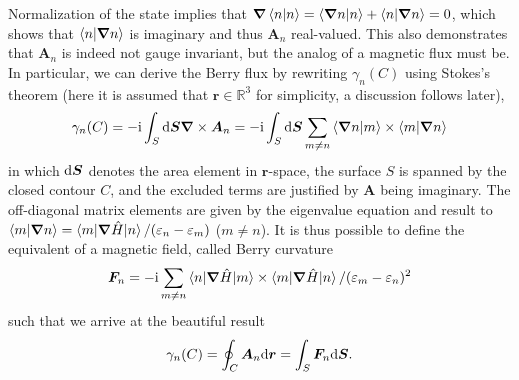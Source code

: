 Normalization of the state implies that $\bm\nabla \braket{n|n} = \braket{\bm\nabla n|n} + \braket{n|\bm\nabla n} = 0$, which shows that $\braket{n|\bm\nabla n}$ is imaginary and thus ${\bm A_n}$ real-valued.
This also demonstrates that $\bm A_n$ is indeed not gauge invariant, but the analog of a magnetic flux must be.
In particular, we can derive the Berry flux by rewriting $\gamma_n(C)$ using Stokes's theorem (here it is assumed that $\bm r\in\mathds R^3$ for simplicity, a discussion follows later),
\begin{align}
    \gamma_n(C) = -\mathrm i\int_S\mathrm d{\bm S}{\bm\nabla}\times{\bm A_n} = -\mathrm i\int_S\mathrm d{\bm S} \sum_{m\neq n}\braket{\bm\nabla n|m}\times\braket{m|\bm\nabla n}
    \label{eq:berry_phase_stokes_theorem}
\end{align}
in which $\mathrm d{\bm S}$ denotes the area element in ${\bm r}$-space, the surface $S$ is spanned by the closed contour $C$, and the excluded terms are justified by $\bm A$ being imaginary.
The off-diagonal matrix elements are given by the eigenvalue equation and result to $\braket{m|{\bm\nabla} n} = \braket{m|\bm\nabla\hat H|n}/(\varepsilon_n-\varepsilon_m)$ ($m\neq n$).
It is thus possible to define the equivalent of a magnetic field, called Berry curvature
\begin{align}
    \bm F_n = -\mathrm i\sum_{m\neq n}\braket{n|\bm\nabla\hat H|m}\times\braket{m|\bm\nabla\hat H|n}/(\varepsilon_m-\varepsilon_n)^2
\end{align}
such that we arrive at the beautiful result
\begin{align}
    \gamma_n(C) = \oint_C{\bm A_n}\mathrm d \bm r = \int_S {\bm F_n} \mathrm d{\bm S}.
\end{align}

